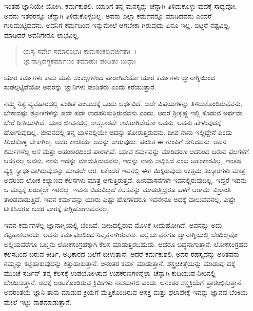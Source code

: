 ಇಂತಹ ಜ್ಞಾನಿಯೇ ಯೋಗಿ, ಕರ್ಮಕುಶಲಿ. ಯಾರಿಗೆ ತನ್ನ ಮನಸ್ಸನ್ನು ಚೆನ್ನಾಗಿ ತಿಳಿದುಕೊಳ್ಳು ವುದಕ್ಕೆ ಸಾಧ್ಯವೋ, ಅವನು ಇತರರನ್ನೂ ಚೆನ್ನಾಗಿ ತಿಳಿದುಕೊಳ್ಳಬಲ್ಲ. ಅವನು ಎಲ್ಲಾ ಕರ್ಮವನ್ನೂ ಮಾಡಿದವನು ಎಂದರೆ ಗುರಿಮುಟ್ಟಿದವನು. ಅವನಿಗೆ ಕರ್ಮದಿಂದ ಇನ್ನುಮೇಲೆ ಆಗಬೇಕಾ ಗಿರುವುದು ಏನೂ ಇಲ್ಲ. ಬಿಟ್ಟರೆ ನಷ್ಟವಿಲ್ಲ. ಮಾಡಿದರೆ ಅವನಿಗೇನೂ ಲಾಭವಿಲ್ಲ.

\begin{verse}
ಯಸ್ಯ ಸರ್ವೇ ಸಮಾರಂಭಾಃ ಕಾಮಸಂಕಲ್ಪವರ್ಜಿತಾಃ~।\\ಜ್ಞಾನಾಗ್ನಿದಗ್ಧಕರ್ಮಾಣಂ ತಮಾಹುಃ ಪಂಡಿತಂ ಬುಧಾಃ 
\end{verse}

{\small ಯಾರ ಕರ್ಮಗಳು ಕಾಮ ಮತ್ತು ಸಂಕಲ್ಪಗಳಿಂದ ಪಾರಾಗಿವೆಯೋ ಯಾರ ಕರ್ಮಗಳು ಜ್ಞಾನಾಗ್ನಿಯಿಂದ ಸುಡಲ್ಪಟ್ಟಿವೆಯೋ ಅವರನ್ನು ಜ್ಞಾನಿಗಳು ಪಂಡಿತರು ಎಂದು ಕರೆಯುತ್ತಾರೆ.}

ನಮ್ಮ ನಿತ್ಯ ವ್ಯವಹಾರದಲ್ಲಿ ಪಂಡಿತ ಎಂಬುದಕ್ಕೆ ಒಂದು ಅರ್ಥವಿದೆ. ಅದೇ ವಿಷಯಗಳನ್ನು ತಿಳಿದುಕೊಂಡಿರುವವನು, ಬೇಕಾದಷ್ಟು ಶ್ಲೋಕಗಳನ್ನು ಪದೇ ಪದೇ ಉದಹರಿಸುತ್ತಿರುವವನು ಎಂದು. ಆದರೆ ಶ‍್ರೀಕೃಷ್ಣ ಇಲ್ಲಿ ಕೊಡುವ ಅರ್ಥವೇ ಬೇರೆ ರೀತಿಯಾಗಿದೆ. ಯಾರ ಜೀವನದಲ್ಲಿ ಶಾಸ್ತ್ರಸಾರವೇ ಉಸಿರಾಗಿದೆಯೋ ಅವನು. ಅವನು ಹೇಳುವುದಕ್ಕೆ ಹೋಗುವುದಿಲ್ಲ. ಜೀವನದಲ್ಲಿ ತನ್ನ ಬಾಳಿನಲ್ಲಿಯೇ ಅದನ್ನು ತೋರುತ್ತಿರುವನು. ದೀಪ ನಾನು ಇಲ್ಲಿದ್ದೇನೆ ಎಂದು ಕಿರಿಚಿಕೊಳ್ಳ ಬೇಕಾಗಿಲ್ಲ. ಅದರ ಕಾಂತಿಯೇ ಅದನ್ನು ಸಾರುವುದು. ಪಂಡಿತ ಈ ಗುಂಪಿಗೆ ಸೇರಿದವನು. ಅವನ ಕರ್ಮಗಳೆಲ್ಲ ಆಸೆ ಮತ್ತು ಅಹಂಕಾರದಿಂದ ಪಾರಾಗಿವೆ. ಯಾವ ಕರ್ಮವನ್ನು ಮಾಡಿದರೂ ಅದರಿಂದ ಬರುವ ಫಲಗಳಿಗೆ ಆಸಕ್ತನಲ್ಲ ಅವನು. ನಾನು ಇದನ್ನು ಮಾಡುತ್ತಿರುವವನು, ಇದನ್ನು ನಾನು ಸಾಧಿಸಿದೆ ಎಂಬ ಅಹಂಕಾರವಿಲ್ಲ. ಇಂತಹ ವ್ಯಕ್ತಿ ಸ್ವಾರ್ಥವಾಗಿರುವುದನ್ನು ಮಾಡಲೇ ಆರ. ಏಕೆಂದರೆ ಇವನಲ್ಲಿ ಈಗ ಮಿಕ್ಕಿರುವುದು ಉತ್ತಮ ಸಂಸ್ಕಾರಗಳು ಮಾತ್ರ. ಅದರಿಂದ ಲೋಕ ಕಲ್ಯಾಣದ ಕೆಲಸಗಳು ಮಾತ್ರ ಆಗುತ್ತಿರುತ್ತವೆ. ಹೀನವಾಸನೆಗಳೇ ಇವನಲ್ಲಿರುವುದಿಲ್ಲ. ಇದ್ದರೆ ಇವನು ಆ ಮಟ್ಟಕ್ಕೆ ಏರುತ್ತಲೇ ಇರಲಿಲ್ಲ. ಇವನು ಬಿಡುವಿಲ್ಲದೆ ಕೆಲಸವನ್ನು ಮಾಡುತ್ತಿದ್ದರೂ ಒಳಗೆ ಆರಾಮ. ವಿಶ್ರಾಂತಿ ತಾಂಡವಾಡುತ್ತಿದೆ. ಇವನ ಕರ್ಮವನ್ನು ಯಾರು ಎಷ್ಟು ಹೊಗಳಿದರೂ ಇವನೇನೂ ಅದಕ್ಕೆ ವಾಲುವವನಲ್ಲ. ಎಷ್ಟೇ ಟೀಕಿಸಿದರೂ ಅದರ ಭಾರಕ್ಕೆ ಕುಗ್ಗಿಹೋಗುವವನಲ್ಲ.

ಇವನ ಕರ್ಮಗಳೆಲ್ಲ ಜ್ಞಾನಾಗ್ನಿಯಲ್ಲಿ ಬೆಂದಿವೆ. ಬೀಜದಲ್ಲಿರುವ ಮೊಳಕೆ ಸೀದುಹೋಗಿದೆ. ಅವನನ್ನು ಅದು ಕಟ್ಟಿಹಾಕಲಾರದು. ಅವನು ಕರ್ಮಫಲದಿಂದ ನಿವೃತ್ತನಾಗಿರುವನು. ಎಲ್ಲಿಯ ವರೆಗೂ ಜ್ಞಾನಾಗ್ನಿಯಲ್ಲಿ ಬೆಂದಿಲ್ಲವೋ ಅಲ್ಲಿಯವರೆಗೂ ಒಬ್ಬನು ಲೋಕಸಂಗ್ರಹಕ್ಕಾಗಿ ಕೆಲಸ ಮಾಡುತ್ತಿರಬಹುದು. ಆದರೂ ಬದ್ಧನಾಗುತ್ತಾನೆ. ಲೋಕಸಂಗ್ರಹದ ಕೆಲಸದಿಂದ ಬರುವ ಕೀರ್ತಿ, ಅಧಿಕಾರದ ಬಲೆಗೆ ಬೀಳುತ್ತಾನೆ. ಆದರೆ ಕರ್ಮಕುಶಲಿ, ಅದರ ರಹಸ್ಯವನ್ನು ಅರಿತವನು ನಮ್ಮನ್ನು ಕಟ್ಟಿಹಾಕುವುದನ್ನು ಕಿತ್ತುಹಾಕುತ್ತಾನೆ. ಅನಂತರ ಕರ್ಮ ಮಾಡುತ್ತಾನೆ. ಶಸ್ತ್ರಚಿಕಿತ್ಸೆಯನ್ನು ಮಾಡುವು ದಕ್ಕೆ ಮುಂಚೆ ಸರ್ಜನ್ ತನ್ನ ಕೆಲಸಕ್ಕೆ ಉಪಯೋಗಿಸುವ ಉಪಕರಣಗಳನ್ನೆಲ್ಲಾ ಚೆನ್ನಾಗಿ ಕುದಿಯುವ ನೀರಿನಲ್ಲಿ ಬೇಯಿಸುತ್ತಾನೆ. ಅದಕ್ಕೆ ಅಂಟಿಕೊಂಡಿರುವ ಕ್ರಿಮಿಗಳು ನಾಶವಾಗಲಿ ಎಂದು. ಅನಂತರ ಶಸ್ತ್ರಕ್ರಿಯೆಗೆ ಪ್ರಾರಂಭಿಸುತ್ತಾನೆ. ಅದರಂತೆಯೆ ಜ್ಞಾನಿ ತಾನು ಮಾಡುವ ಕ್ರಿಯೆಗೆ ಮೆತ್ತಿಕೊಂಡಿರುವ ಆಸಕ್ತಿ ಮತ್ತು ಫಲಾಪೇಕ್ಷೆ ಇವನ್ನು ಜ್ಞಾನದ ಬೆಂಕಿಯ ಮೇಲೆ ಇಟ್ಟು ನಾಶಮಾಡುತ್ತಾನೆ.

